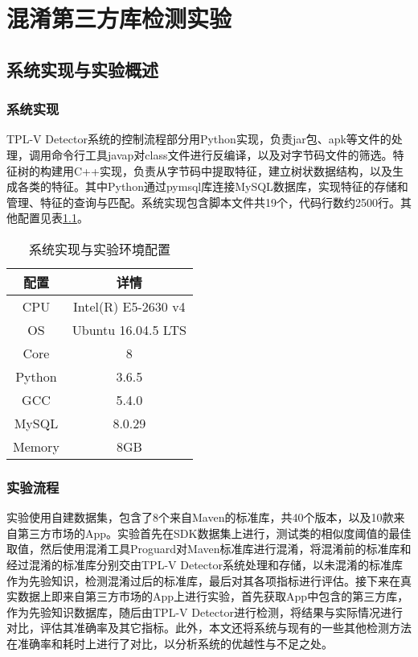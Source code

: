 \chapter{混淆第三方库检测实验}



\section{系统实现与实验概述}

\subsection{系统实现}
TPL-V Detector系统的控制流程部分用Python实现，负责jar包、apk等文件的处理，调用命令行工具javap对class文件进行反编译，以及对字节码文件的筛选。特征树的构建用C++实现，负责从字节码中提取特征，建立树状数据结构，以及生成各类的特征。其中Python通过pymsql库连接MySQL数据库，实现特征的存储和管理、特征的查询与匹配。系统实现包含脚本文件共19个，代码行数约2500行。其他配置见表\ref{tab:config}。

\begin{table}[!hpt]
  \caption{系统实现与实验环境配置}
  \label{tab:config}
  \centering
  \begin{tabular}{cc} \toprule
    配置 &  详情 \\ \midrule
	CPU & Intel(R) E5-2630 v4\\
	OS & Ubuntu 16.04.5 LTS\\
	Core & 8\\
	Python & 3.6.5\\
	GCC & 5.4.0\\
	MySQL & 8.0.29\\
	Memory & 8GB\\
	 \bottomrule

  \end{tabular}
\end{table}


\subsection{实验流程}
实验使用自建数据集，包含了8个来自Maven的标准库，共40个版本，以及10款来自第三方市场的App。实验首先在SDK数据集上进行，测试类的相似度阈值的最佳取值，然后使用混淆工具Proguard对Maven标准库进行混淆，将混淆前的标准库和经过混淆的标准库分别交由TPL-V Detector系统处理和存储，以未混淆的标准库作为先验知识，检测混淆过后的标准库，最后对其各项指标进行评估。接下来在真实数据上即来自第三方市场的App上进行实验，首先获取App中包含的第三方库，作为先验知识数据库，随后由TPL-V Detector进行检测，将结果与实际情况进行对比，评估其准确率及其它指标。此外，本文还将系统与现有的一些其他检测方法在准确率和耗时上进行了对比，以分析系统的优越性与不足之处。

